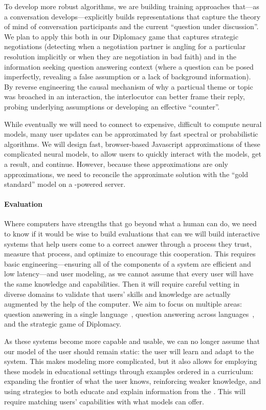 To develop more robust algorithms, we are building training approaches
that---as a conversation develops---explicitly builds representations that
capture the theory of mind of conversation participants and the
current ``question under discussion''.
%
We plan to apply this both in our Diplomacy game that captures
strategic negotiations (detecting when a negotiation partner is
angling for a particular resolution implicitly or when they are
negotiation in bad faith) and in the information seeking question
answering context (where a question can be posed imperfectly,
revealing a false assumption or a lack of background information).
%
By reverse engineering the causal mechanism of why a particual theme
or topic was broached in an interaction, the  interlocutor can
better frame their reply, probing underlying assumptions or
developing an effective ``counter''.

While eventually we will need to connect to expensive, difficult to
compute neural models, many user updates can be approximated by fast
spectral or probabilistic algorithms.
%
We will design fast, browser-based Javascript approximations of these
complicated neural models, to allow users to quickly interact with the
models, get a result, and continue.
%
However, because these approximations are only approximations, we need
to reconcile the approximate solution with the ``gold standard'' model
on a -powered server.

\paragraph{Evaluation}
%
Where computers have strengths that go beyond what a human can do, we
need to know if it would be wise to build evaluations that can we
will build interactive systems that help users come to a correct
answer through a process they trust, measure that process, and
optimize to encourage this cooperation.
%
This requires basic engineering---ensuring all of the components of
a system are efficient and low latency---and user modeling, as we
cannot assume that every user will have the same knowledge and
capabilities.
%
Then it will require careful vetting in diverse domains to validate
that users' skills and knowledge are actually augmented by the help of
the computer.
%
We aim to focus on multiple areas: question answering in a single
language~\cite{He-22}, question answering across
languages~\cite{han-22}, and the strategic game of Diplomacy.

As these systems become more capable and usable, we can no longer
assume that our model of the user should remain static: the user will
learn and adapt to the system.
%
This makes modeling more complicated, but it also allows for employing
these models in educational settings through examples ordered in a
curriculum: expanding the frontier of what the user knows, reinforcing
weaker knowledge, and using strategies to both educate and explain
information from the .
%
This will require matching users' capabilities with what models can
offer.

